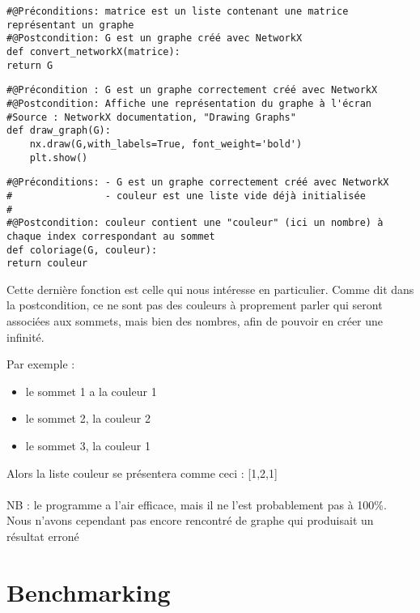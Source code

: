 \documentclass[a4paper, 11pt, oneside]{article}
\begin{document}
\begin{lstlisting}[caption={Convertir la matrice en graphe}]
#@Préconditions: matrice est un liste contenant une matrice représentant un graphe
#@Postcondition: G est un graphe créé avec NetworkX
def convert_networkX(matrice):
return G
\end{lstlisting}

\begin{lstlisting}[caption={Afficher le graphique à l'écran}]
#@Précondition : G est un graphe correctement créé avec NetworkX
#@Postcondition: Affiche une représentation du graphe à l'écran
#Source : NetworkX documentation, "Drawing Graphs"
def draw_graph(G):
    nx.draw(G,with_labels=True, font_weight='bold')
    plt.show()
\end{lstlisting}



\begin{lstlisting}[caption={Coloriage des sommets}]
#@Préconditions: - G est un graphe correctement créé avec NetworkX
#                - couleur est une liste vide déjà initialisée
#
#@Postcondition: couleur contient une "couleur" (ici un nombre) à chaque index correspondant au sommet
def coloriage(G, couleur):
return couleur
\end{lstlisting}
Cette dernière fonction est celle qui nous intéresse en particulier.
Comme dit dans la postcondition, ce ne sont pas des couleurs à proprement parler qui seront associées aux sommets, mais bien des nombres, afin de pouvoir en créer une infinité.

Par exemple : \begin{itemize}
              \item le sommet 1 a la couleur 1
              \item le sommet 2, la couleur 2
              \item le sommet 3, la couleur 1
              \end{itemize}
Alors la liste couleur se présentera comme ceci : [1,2,1]
\\
\\
NB : le programme a l'air efficace, mais il ne l'est probablement pas à 100\%. Nous n'avons cependant pas encore rencontré de graphe qui produisait un résultat erroné



\section{Benchmarking}
\end{document}
